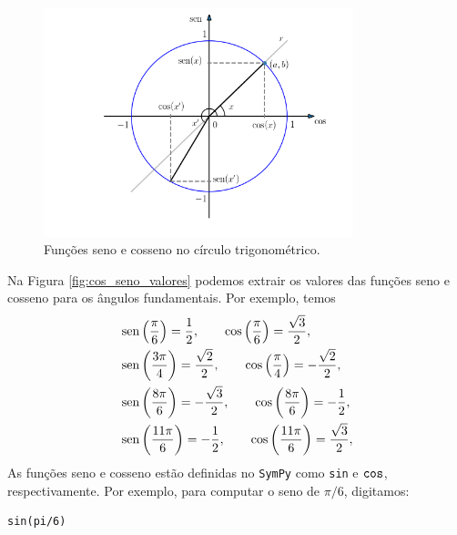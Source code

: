 \begin{figure}[H]
  \centering
  \includegraphics[width=0.8\textwidth]{./cap_funcao/dados/fig_cos_seno/fig_cos_seno}
  \caption{Funções seno e cosseno no círculo trigonométrico.}
  \label{fig:cos_seno}
\end{figure}

Na Figura \ref{fig:cos_seno_valores} podemos extrair os valores das funções seno e cosseno para os ângulos fundamentais. Por exemplo, temos
\begin{align}
  &\operatorname{sen}\left(\frac{\pi}{6}\right) = \frac{1}{2},\qquad \cos\left(\frac{\pi}{6}\right) = \frac{\sqrt{3}}{2},\\
  &\operatorname{sen}\left(\frac{3\pi}{4}\right) = \frac{\sqrt{2}}{2},\qquad \cos\left(\frac{\pi}{4}\right) = -\frac{\sqrt{2}}{2},\\
  &\operatorname{sen}\left(\frac{8\pi}{6}\right) = -\frac{\sqrt{3}}{2},\qquad \cos\left(\frac{8\pi}{6}\right) = -\frac{1}{2},\\
  &\operatorname{sen}\left(\frac{11\pi}{6}\right) = -\frac{1}{2},\qquad \cos\left(\frac{11\pi}{6}\right) = \frac{\sqrt{3}}{2},\\
\end{align}
\ifispython
As funções seno e cosseno estão definidas no \verb+SymPy+ como \verb+sin+ e $\verb+cos+$, respectivamente. Por exemplo, para computar o seno de $\pi/6$, digitamos:
\begin{verbatim}
sin(pi/6)
\end{verbatim}
\fi

